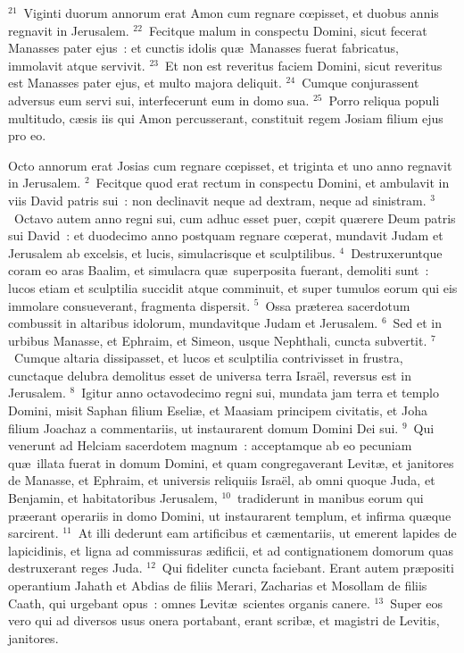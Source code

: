 ${}^{21}$~Viginti duorum annorum erat Amon cum regnare cœpisset, et duobus annis regnavit in Jerusalem.
${}^{22}$~Fecitque malum in conspectu Domini, sicut fecerat Manasses pater ejus~: et cunctis idolis qu\ae\ Manasses fuerat fabricatus, immolavit atque servivit.
${}^{23}$~Et non est reveritus faciem Domini, sicut reveritus est Manasses pater ejus, et multo majora deliquit.
${}^{24}$~Cumque conjurassent adversus eum servi sui, interfecerunt eum in domo sua.
${}^{25}$~Porro reliqua populi multitudo, c\ae sis iis qui Amon percusserant, constituit regem Josiam filium ejus pro eo.

\bchapter
\lettrine[lines=3,image=true,loversize=0.05,lraise=-0.03]{O}{}cto annorum erat Josias cum regnare cœpisset, et triginta et uno anno regnavit in Jerusalem.
${}^{2}$~Fecitque quod erat rectum in conspectu Domini, et ambulavit in viis David patris sui~: non declinavit neque ad dextram, neque ad sinistram.
${}^{3}$~Octavo autem anno regni sui, cum adhuc esset puer, cœpit qu\ae rere Deum patris sui David~: et duodecimo anno postquam regnare cœperat, mundavit Judam et Jerusalem ab excelsis, et lucis, simulacrisque et sculptilibus.
${}^{4}$~Destruxeruntque coram eo aras Baalim, et simulacra qu\ae\ superposita fuerant, demoliti sunt~: lucos etiam et sculptilia succidit atque comminuit, et super tumulos eorum qui eis immolare consueverant, fragmenta dispersit.
${}^{5}$~Ossa pr\ae terea sacerdotum combussit in altaribus idolorum, mundavitque Judam et Jerusalem.
${}^{6}$~Sed et in urbibus Manasse, et Ephraim, et Simeon, usque Nephthali, cuncta subvertit.
${}^{7}$~Cumque altaria dissipasset, et lucos et sculptilia contrivisset in frustra, cunctaque delubra demolitus esset de universa terra Isra\"el, reversus est in Jerusalem.
${}^{8}$~Igitur anno octavodecimo regni sui, mundata jam terra et templo Domini, misit Saphan filium Eseli\ae , et Maasiam principem civitatis, et Joha filium Joachaz a commentariis, ut instaurarent domum Domini Dei sui.
${}^{9}$~Qui venerunt ad Helciam sacerdotem magnum~: acceptamque ab eo pecuniam qu\ae\ illata fuerat in domum Domini, et quam congregaverant Levit\ae , et janitores de Manasse, et Ephraim, et universis reliquiis Isra\"el, ab omni quoque Juda, et Benjamin, et habitatoribus Jerusalem,
${}^{10}$~tradiderunt in manibus eorum qui pr\ae erant operariis in domo Domini, ut instaurarent templum, et infirma qu\ae que sarcirent.
${}^{11}$~At illi dederunt eam artificibus et c\ae mentariis, ut emerent lapides de lapicidinis, et ligna ad commissuras \ae dificii, et ad contignationem domorum quas destruxerant reges Juda.
${}^{12}$~Qui fideliter cuncta faciebant. Erant autem pr\ae positi operantium Jahath et Abdias de filiis Merari, Zacharias et Mosollam de filiis Caath, qui urgebant opus~: omnes Levit\ae\ scientes organis canere.
${}^{13}$~Super eos vero qui ad diversos usus onera portabant, erant scrib\ae , et magistri de Levitis, janitores.



